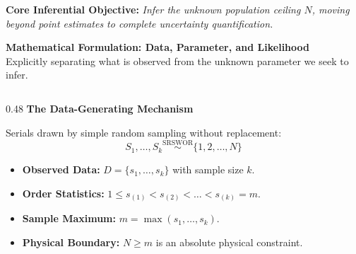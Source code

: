 \documentclass[aspectratio=169,10pt]{beamer}
\begin{document}
\begin{frame}[c]
  \vspace{0.18cm}
  \begin{center}
    {\footnotesize \textbf{\color{headernavy} Core Inferential Objective: } \textit{Infer the unknown population ceiling $N$, moving beyond point estimates to complete uncertainty quantification.}}
  \end{center}
\end{frame}

\begin{frame}[c]
  \begin{center}
    {\large \textbf{\color{headernavy} Mathematical Formulation: Data, Parameter, and Likelihood}}\\[0.10cm]
    {\scriptsize \color{subgray} Explicitly separating what is observed from the unknown parameter we seek to infer.}
  \end{center}
  \vspace{0.38cm}
  
  \begin{columns}[t,onlytextwidth]
    \begin{column}{0.48\textwidth}
      {\small \textbf{\color{accentblue} The Data-Generating Mechanism}}\\[0.08cm]
      {\scriptsize Serials drawn by simple random sampling without replacement:
      \begin{equation*}
        S_1, \ldots, S_k \overset{\mathrm{SRSWOR}}{\sim} \{1, 2, \ldots, N\}
      \end{equation*}
      \begin{itemize}
        \setlength{\itemsep}{0.08cm}
        \item \textbf{Observed Data:} $D = \{s_1, \ldots, s_k\}$ with sample size $k$.
        \item \textbf{Order Statistics:} $1 \le s_{(1)} < s_{(2)} < \dots < s_{(k)} = m$.
        \item \textbf{Sample Maximum:} $m = \max(s_1, \ldots, s_k)$.
        \item \textbf{Physical Boundary:} $N \ge m$ is an absolute physical constraint.
      \end{itemize}}
    \end{column}
    

\end{columns}
\end{frame}
\end{document}

